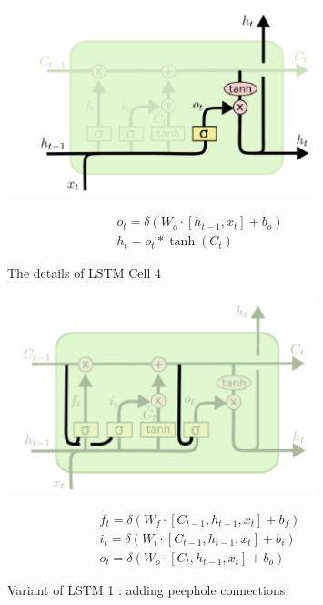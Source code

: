 \documentclass[12pt,a4paper]{article}
\begin{document}
\begin{figure}
\begin{minipage}[c]{0.5\textwidth}
\centering   
\includegraphics[width=0.8\textwidth]{pic/9.PNG}
\end{minipage}
%
\begin{minipage}[c]{0.5\textwidth}
\begin{equation*}
	\begin{array}{l}
	o_t = \delta (W_o \cdot [h_{t-1}, x_t] + b_o)\\
	h_t = o_t * \tanh(C_t)
	\end{array}
\end{equation*}
\end{minipage}
\caption{The details of LSTM Cell 4}
 \label{fig:9} 
\end{figure}

\begin{figure}
\begin{minipage}[c]{0.5\textwidth}
\centering   
\includegraphics[width=0.8\textwidth]{pic/10.PNG}
\end{minipage}
%
\begin{minipage}[c]{0.5\textwidth}
\begin{equation*}
	\begin{array}{l}
	f_t = \delta(W_f \cdot [C_{t-1}, h_{t-1}, x_{t}] + b_f) \\
	i_t = \delta(W_{i} \cdot [C_{t-1}, h_{t-1}, x_{t}] + b_i) \\
	o_t = \delta(W_{o} \cdot [C_{t}, h_{t-1}, x_{t}] + b_{o})
	\end{array}
\end{equation*}
\end{minipage}
\caption{Variant of LSTM 1 : adding peephole connections}
 \label{fig:10} 
\end{figure}
\end{document}
